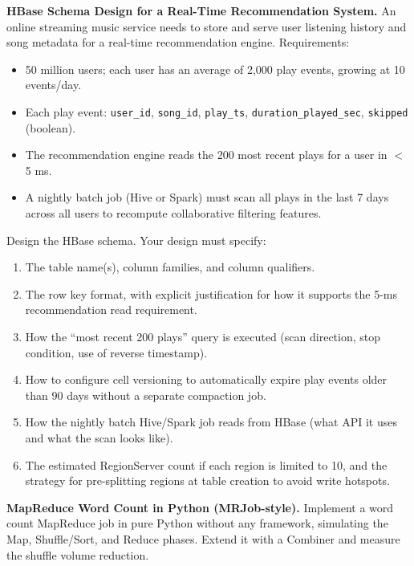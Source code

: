 \dpr \textbf{HBase Schema Design for a Real-Time Recommendation System.}
An online streaming music service needs to store and serve user
listening history and song metadata for a real-time recommendation
engine. Requirements:
\begin{itemize}
  \item 50 million users; each user has an average of 2,000 play
        events, growing at 10 events/day.
  \item Each play event: \texttt{user\_id}, \texttt{song\_id},
        \texttt{play\_ts}, \texttt{duration\_played\_sec},
        \texttt{skipped} (boolean).
  \item The recommendation engine reads the 200 most recent plays
        for a user in $<$5 ms.
  \item A nightly batch job (Hive or Spark) must scan all plays
        in the last 7 days across all users to recompute
        collaborative filtering features.
\end{itemize}

Design the HBase schema. Your design must specify:
\begin{enumerate}[label=(\alph*)]
  \item The table name(s), column families, and column qualifiers.
  \item The row key format, with explicit justification for how it
        supports the 5-ms recommendation read requirement.
  \item How the ``most recent 200 plays'' query is executed
        (scan direction, stop condition, use of reverse timestamp).
  \item How to configure cell versioning to automatically expire
        play events older than 90 days without a separate compaction job.
  \item How the nightly batch Hive/Spark job reads from HBase
        (what API it uses and what the scan looks like).
  \item The estimated RegionServer count if each region is limited
        to 10\GB, and the strategy for pre-splitting regions at
        table creation to avoid write hotspots.
\end{enumerate}

\bigskip
{}

\pe \textbf{MapReduce Word Count in Python (MRJob-style).}
Implement a word count MapReduce job in pure Python without any
framework, simulating the Map, Shuffle/Sort, and Reduce phases.
Extend it with a Combiner and measure the shuffle volume reduction.

